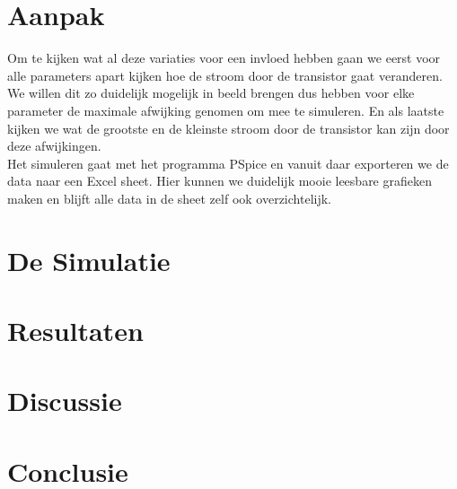\documentclass{article}
\begin{document}
\section{Aanpak}

Om te kijken wat al deze variaties voor een invloed hebben gaan we eerst voor alle parameters apart kijken hoe de stroom door de transistor gaat veranderen. We willen dit zo duidelijk mogelijk in beeld brengen dus hebben voor elke parameter de maximale afwijking genomen om mee te simuleren. En als laatste kijken we wat de grootste en de kleinste stroom door de transistor kan zijn door deze afwijkingen.\\
Het simuleren gaat met het programma PSpice en vanuit daar exporteren we de data naar een Excel sheet. Hier kunnen we duidelijk mooie leesbare grafieken maken en blijft alle data in de sheet zelf ook overzichtelijk.

\section{De Simulatie}

\section{Resultaten}

\section{Discussie}

\section{Conclusie}
\end{document}
